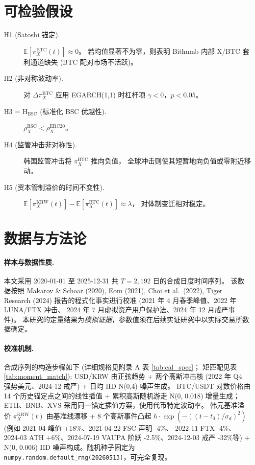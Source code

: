 \documentclass[11pt,a4paper]{article}
\begin{document}
\section{可检验假设}

\begin{description}
\item[H1 (Satoshi 锚定).] $\mathbb{E}[\pi^{\text{BTC}}_X(t)] \approx 0$。
若均值显著不为零，则表明 Bithumb 内部 X/BTC 套利通道缺失 (BTC 配对市场不活跃)。
\item[H2 (非对称波动率).] 对 $\Delta\pi^{\text{BTC}}_X$ 应用 EGARCH(1,1) 时杠杆项 $\gamma < 0$，$p<0.05$。
\item[H3 = $\mathrm{H_{BSC}}$ (标准化 BSC 优越性).] $\rho_X^{\text{BSC}} < \rho_X^{\text{ERC20}}$。
\item[H4 (监管冲击非对称性).] 韩国监管冲击将 $\pi^{\text{BTC}}_X$ 推向负值，
全球冲击则使其短暂地向负值或零附近移动。
\item[H5 (资本管制溢价的时间不变性).]
$\mathbb{E}[\pi^{\text{KRW}}_X(t)] - \mathbb{E}[\pi^{\text{BTC}}_X(t)] \approx \lambda$，
对体制变迁相对稳定。
\end{description}

\section{数据与方法论}

\paragraph{样本与数据性质.}
本文采用 2020-01-01 至 2025-12-31 共 $T=2{,}192$ 日的合成日度时间序列。
该数据按照 Makarov \& Schoar (2020), Eom (2021), Choi et al.\ (2022), Tiger Research (2024)
报告的程式化事实进行校准 (2021 年 4 月春季峰值、2022 年 LUNA/FTX 冲击、
2024 年 7 月虚拟资产用户保护法、2024 年 12 月戒严事件)。
本研究的定量结果为\emph{模拟证据}，参数值须在后续实证研究中以实际交易所数据确定。

\paragraph{校准机制.}
合成序列的构造步骤如下 (详细规格见附录 A 表 \ref{tab:cal_spec}；
矩匹配见表 \ref{tab:moment_match}):
USD/KRW 由正弦趋势 + 两个高斯冲击核 (2022 年 Q4 强势美元、2024-12 戒严) + 日均 IID N(0,4) 噪声生成。
BTC/USDT 对数价格由 14 个历史锚定点之间的线性插值 + 累积高斯随机游走 N(0, 0.018) 增量生成；
ETH、BNB、XVS 采用同一锚定插值方案，使用代币特定波动率。
韩元基准溢价 $\pi^{\text{KRW}}_X(t)$ 由基准线漂移 + 8 个高斯事件凸起
$h\cdot\exp(-((t-t_0)/\sigma_d)^2)$ (例如 2021-04 峰值 +18\%、2021-04-22 FSC 声明 -4\%、
2022-11 FTX -4\%、2024-03 ATH +6\%、2024-07-19 VAUPA 阶跃 -2.5\%、2024-12-03 戒严 -32\%等)
+ N(0, 0.006) IID 噪声构成。随机种子固定为 \texttt{numpy.random.default\_rng(20260513)}，可完全复现。
\end{document}
